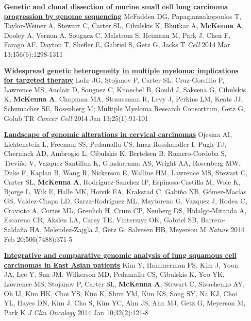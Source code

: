 \documentclass[9pt]{article}
\begin{document}
\noindent\href{https://www.ncbi.nlm.nih.gov/pubmed/24630729}{\bf  Genetic and clonal dissection of murine small cell lung carcinoma progression by genome sequencing}\vspace{-0.03in}
\newline\noindent McFadden DG, Papagiannakopoulos T, Taylor-Weiner A, Stewart C, Carter SL, Cibulskis K, Bhutkar A, \textbf{McKenna A}, Dooley A, Vernon A, Sougnez C, Malstrom S, Heimann M, Park J, Chen F, Farago AF, Dayton T, Shefler E, Gabriel S, Getz G, Jacks T
\newline\noindent\emph{ Cell} 2014 Mar 13;156(6):1298-1311
\bigskip

\noindent\href{https://www.ncbi.nlm.nih.gov/pubmed/24434212}{\bf  Widespread genetic heterogeneity in multiple myeloma: implications for targeted therapy}\vspace{-0.03in}
\newline\noindent Lohr JG, Stojanov P, Carter SL, Cruz-Gordillo P, Lawrence MS, Auclair D, Sougnez C, Knoechel B, Gould J, Saksena G, Cibulskis K, \textbf{McKenna A}, Chapman MA, Straussman R, Levy J, Perkins LM, Keats JJ, Schumacher SE, Rosenberg M; Multiple  Myeloma Research Consortium, Getz G, Golub TR
\newline\noindent\emph{ Cancer Cell} 2014 Jan 13;25(1):91-101
\bigskip

\noindent\href{https://www.ncbi.nlm.nih.gov/pubmed/24390348}{\bf  Landscape of genomic alterations in cervical carcinomas}\vspace{-0.03in}
\newline\noindent Ojesina AI, Lichtenstein L, Freeman SS, Pedamallu CS, Imaz-Rosshandler I, Pugh TJ, Cherniack AD, Ambrogio L, Cibulskis K, Bertelsen B, Romero-Cordoba S, Treviño V, Vazquez-Santillan K, Guadarrama AS, Wright AA, Rosenberg MW, Duke F, Kaplan B, Wang R, Nickerson E, Walline HM, Lawrence MS, Stewart C, Carter SL, \textbf{McKenna A}, Rodriguez-Sanchez IP, Espinosa-Castilla M, Woie K, Bjorge L, Wik E, Halle MK, Hoivik EA, Krakstad C, Gabiño NB, Gómez-Macías GS, Valdez-Chapa LD, Garza-Rodríguez ML, Maytorena G, Vazquez J, Rodea C, Cravioto A, Cortes ML, Greulich H, Crum CP, Neuberg DS, Hidalgo-Miranda A, Escareno CR, Akslen LA, Carey TE, Vintermyr OK, Gabriel SB, Barrera-Saldaña HA, Melendez-Zajgla J, Getz G, Salvesen HB, Meyerson M
\newline\noindent\emph{ Nature} 2014 Feb 20;506(7488):371-5
\bigskip

\noindent\href{https://www.ncbi.nlm.nih.gov/pubmed/24323028}{\bf  Integrative and comparative genomic analysis of lung squamous cell carcinomas  in East Asian patients}\vspace{-0.03in}
\newline\noindent Kim Y, Hammerman PS, Kim J, Yoon JA, Lee Y, Sun JM, Wilkerson MD, Pedamallu CS, Cibulskis K, Yoo YK, Lawrence MS, Stojanov P, Carter SL, \textbf{McKenna A}, Stewart C, Sivachenko AY, Oh IJ, Kim HK, Choi YS, Kim K, Shim YM, Kim KS, Song SY, Na KJ, Choi YL, Hayes DN, Kim J, Cho S, Kim YC, Ahn JS, Ahn MJ, Getz G, Meyerson M, Park K
\newline\noindent\emph{ J Clin Oncology} 2014 Jan 10;32(2):121-8
\bigskip
\end{document}
